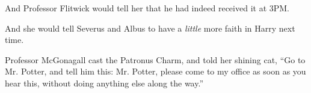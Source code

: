 And Professor Flitwick would tell her that he had indeed received it at
3PM.

And she would tell Severus and Albus to have a \emph{little} more faith
in Harry next time.

Professor McGonagall cast the Patronus Charm, and told her shining cat,
``Go to Mr. Potter, and tell him this: Mr. Potter, please come to my
office as soon as you hear this, without doing anything else along the
way.''
